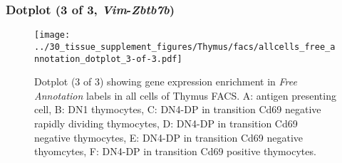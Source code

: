 \clearpage

\subsubsection{Dotplot (3 of 3, \emph{Vim}-\emph{Zbtb7b})}
\begin{figure}[h]
\centering
\texttt{[image: ../30\_tissue\_supplement\_figures/Thymus/facs/allcells\_free\_annotation\_dotplot\_3-of-3.pdf]}

\caption{ Dotplot (3 of 3)  showing gene expression enrichment in \emph{Free Annotation} labels in all cells of Thymus FACS. A: antigen presenting cell, B: DN1 thymocytes, C: DN4-DP in transition Cd69 negative rapidly dividing thymocytes, D: DN4-DP in transition Cd69 negative thymocytes, E: DN4-DP in transition Cd69 negative thyomcytes, F: DN4-DP in transition Cd69 positive thymocytes.}
\end{figure}

